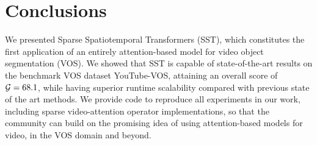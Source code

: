 \section{Conclusions}

We presented Sparse Spatiotemporal Transformers (SST), which constitutes the
first application of an entirely attention-based model for video object
segmentation (VOS).
We showed that SST is capable of state-of-the-art results on the benchmark VOS
dataset YouTube-VOS, attaining an overall score of~$\mathcal{G} = 68.1$,
while having superior runtime scalability compared with previous state of the
art methods.
We provide code to reproduce all experiments in our work, including sparse
video-attention operator implementations, so that the community can build on
the promising idea of using attention-based models for video, in the VOS domain
and beyond.
